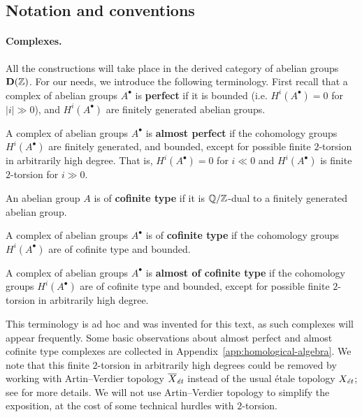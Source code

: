 \documentclass{article}
\numberwithin{equation}{section}
\begin{document}
\subsection*{Notation and conventions}

\paragraph{Complexes.}
All the constructions will take place in the derived category of abelian groups
$\mathbf{D} (\ZZ)$. For our needs, we introduce the following terminology.
First recall that a complex of abelian groups $A^\bullet$ is \textbf{perfect} if
it is bounded (i.e. $H^i (A^\bullet) = 0$ for $|i| \gg 0$), and $H^i (A^\bullet)$
are finitely generated abelian groups.

\begin{definition}
  \label{dfn:almost-of-(co)finite-type}
  A complex of abelian groups $A^\bullet$ is \textbf{almost perfect}
  if the cohomology groups $H^i (A^\bullet)$ are finitely generated, and
  bounded, except for possible finite $2$-torsion in arbitrarily high degree.
  That is, $H^i (A^\bullet) = 0$ for $i \ll 0$ and $H^i (A^\bullet)$ is finite
  $2$-torsion for $i \gg 0$.

  An abelian group $A$ is of \textbf{cofinite type} if it is $\QQ/\ZZ$-dual to
  a finitely generated abelian group.

  A complex of abelian groups $A^\bullet$ is of \textbf{cofinite type} if the
  cohomology groups $H^i (A^\bullet)$ are of cofinite type and bounded.

  A complex of abelian groups $A^\bullet$ is \textbf{almost of cofinite type}
  if the cohomology groups $H^i (A^\bullet)$ are of cofinite type and
  bounded, except for possible finite $2$-torsion in arbitrarily high
  degree.
\end{definition}

This terminology is ad hoc and was invented for this text, as such complexes
will appear frequently. Some basic observations about almost perfect and almost
cofinite type complexes are collected in
Appendix~\ref{app:homological-algebra}. We note that this finite $2$-torsion
in arbitrarily high degrees could be removed by working with Artin--Verdier
topology $\overline{X}_\et$ instead of the usual étale topology $X_\et$;
see \cite[Appendix~A]{Flach-Morin-2018} for more details. We will not use
Artin--Verdier topology to simplify the exposition, at the cost of some
technical hurdles with $2$-torsion.
\end{document}
